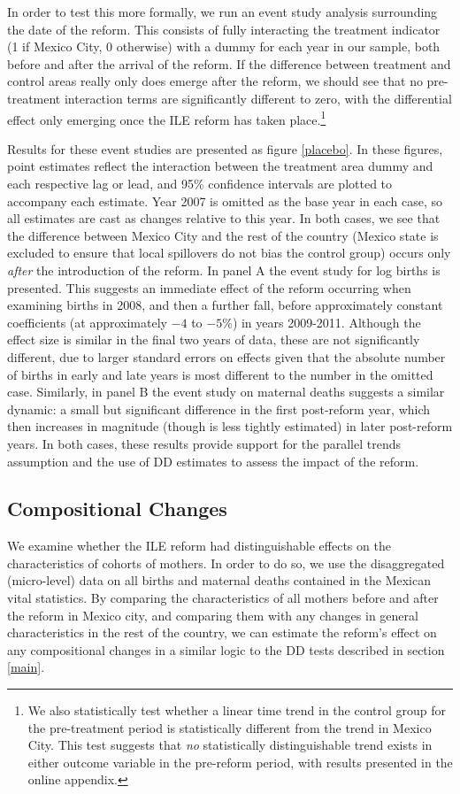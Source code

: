 \documentclass[a4paper, 11pt]{article}
\begin{document}
\begin{spacing}{2}
In order to test this more formally, we run an event study analysis surrounding the date of the reform.  This consists of fully interacting the treatment indicator (1 if Mexico City, 0 otherwise) with a dummy for each year in our sample, both before and after the arrival of the reform.  If the difference between treatment and control areas really only does emerge after the reform, we should see that no pre-treatment interaction terms are significantly different to zero, with the differential effect only emerging once the ILE reform has taken place.\footnote{We also statistically test whether a linear time trend in the control group for the pre-treatment period is statistically different from the trend in Mexico City. This test suggests that \emph{no} statistically distinguishable trend exists in either outcome variable in the pre-reform period, with results presented in the online appendix.}

Results for these event studies are presented as figure \ref{placebo}.  In these figures, point estimates reflect the interaction between the treatment area dummy and each respective lag or lead, and 95\% confidence intervals are plotted to accompany each estimate.  Year 2007 is omitted as the base year in each case, so all estimates are cast as changes relative to this year.  In both cases, we see that the difference between Mexico City and the rest of the country (Mexico state is excluded to ensure that local spillovers do not bias the control group) occurs only \emph{after} the introduction of the reform.  In panel A the event study for log births is presented.  This suggests an immediate effect of the reform occurring when examining births in 2008, and then a further fall, before approximately constant coefficients (at approximately $-4$ to $-5\%$) in years 2009-2011.  Although the effect size is similar in the final two years of data, these are not significantly different, due to larger standard errors on effects given that the absolute number of births in early and late years is most different to the number in the omitted case.  Similarly, in panel B the event study on maternal deaths suggests a similar dynamic: a small but significant difference in the first post-reform year, which then increases in magnitude (though is less tightly estimated) in later post-reform years.  In both cases, these results provide support for the parallel trends assumption and the use of DD estimates to assess the impact of the reform.

\subsection{Compositional Changes}\label{CompositionalChanges}
We examine whether the ILE reform had distinguishable effects on the characteristics of cohorts of mothers.  In order to do so, we use the disaggregated (micro-level) data on all births and maternal deaths contained in the Mexican vital statistics.  By comparing the characteristics of all mothers before and after the reform in Mexico city, and comparing them with any changes in general characteristics in the rest of the country, we can estimate the reform's effect on any compositional changes in a similar logic to the DD tests described in section \ref{main}. 


\end{spacing}
\end{document}
